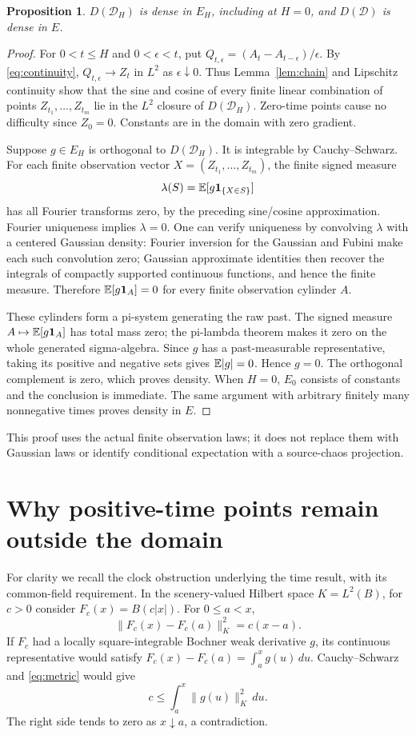 \documentclass[11pt]{article}
\newtheorem{proposition}[theorem]{Proposition}
\newcommand{\D}{\mathcal D}\newcommand{\G}{\mathcal G}
\begin{document}
\begin{proposition}\label{prop:dense}
$D(\D_H)$ is dense in $E_H$, including at $H=0$, and $D(\D)$ is dense
in $E$.
\end{proposition}
\begin{proof}
For $0<t\leq H$ and $0<\epsilon<t$, put
$Q_{t,\epsilon}=(A_t-A_{t-\epsilon})/\epsilon$. By
\eqref{eq:continuity}, $Q_{t,\epsilon}\to Z_t$ in $L^2$ as
$\epsilon\downarrow0$. Thus Lemma~\ref{lem:chain} and Lipschitz
continuity show that the sine and cosine of every finite linear
combination of points $Z_{t_1},\ldots,Z_{t_m}$ lie in the $L^2$ closure
of $D(\D_H)$. Zero-time points cause no difficulty since $Z_0=0$.
Constants are in the domain with zero gradient.

Suppose $g\in E_H$ is orthogonal to $D(\D_H)$. It is integrable by
Cauchy--Schwarz. For each finite observation vector
$X=(Z_{t_1},\ldots,Z_{t_m})$, the finite signed measure
\[
 \lambda(S)=\mathbb E[g\mathbf1_{\{X\in S\}}]
\]
has all Fourier transforms zero, by the preceding sine/cosine
approximation. Fourier uniqueness implies $\lambda=0$. One can verify
uniqueness by convolving $\lambda$ with a centered Gaussian density:
Fourier inversion for the Gaussian and Fubini make each such convolution
zero; Gaussian approximate identities then recover the integrals of
compactly supported continuous functions, and hence the finite measure.
Therefore $\mathbb E[g\mathbf1_A]=0$ for every finite observation cylinder $A$.

These cylinders form a pi-system generating the raw past. The signed
measure $A\mapsto\mathbb E[g\mathbf1_A]$ has total mass zero; the pi-lambda
theorem makes it zero on the whole generated sigma-algebra. Since $g$
has a past-measurable representative, taking its positive and negative
sets gives $\mathbb E|g|=0$. Hence $g=0$. The orthogonal complement is zero,
which proves density. When $H=0$, $E_0$ consists of constants and the
conclusion is immediate. The same argument with arbitrary finitely
many nonnegative times proves density in $E$.
\end{proof}

This proof uses the actual finite observation laws; it does not replace
them with Gaussian laws or identify conditional expectation with a
source-chaos projection.

\section{Why positive-time points remain outside the domain}
For clarity we recall the clock obstruction underlying the time result,
with its common-field requirement. In the scenery-valued Hilbert space
$K=L^2(B)$, for $c>0$ consider $F_c(x)=B(c|x|)$.
For $0\leq a<x$,
\begin{equation}\label{eq:metric}
 \|F_c(x)-F_c(a)\|_K^2=c(x-a).
\end{equation}
If $F_c$ had a locally square-integrable Bochner weak derivative $g$,
its continuous representative would satisfy
$F_c(x)-F_c(a)=\int_a^x g(u)\,du$. Cauchy--Schwarz and
\eqref{eq:metric} would give
\[
 c\leq\int_a^x\|g(u)\|_K^2\,du.
\]
The right side tends to zero as $x\downarrow a$, a contradiction.
\end{document}
